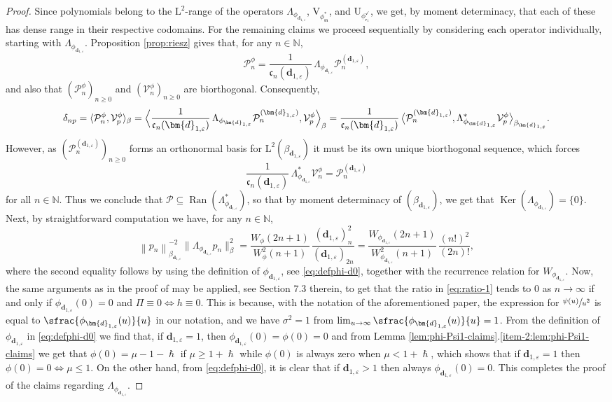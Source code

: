 \documentclass[10pt]{amsart}
\let\epsilon\varepsilon
\theoremstyle{plain}
\theoremstyle{definition}
\newcommand{\norm}[1]{\left\lVert#1\right\rVert}
\newcommand{\bnorm}[1]{\bigl\lVert#1\bigr\rVert}
\DeclareMathOperator{\Ran}{Ran}
\DeclareMathOperator{\Ker}{Ker}
\newcommand{\N}{\mathbb{N}}
\newcommand{\Poly}{\mathscr{P}}
\renewcommand{\P}{\mathcal{P}}
\newcommand{\V}{\mathcal{V}}
\newcommand{\Leb}{\mathrm{L}}
\newcommand{\m}{\mathfrak{m}}
\newcommand{\dz}{{\bm{d}}_{1,\epsilon}}
\newcommand{\lam}{{\bm{\lambda}_1}}
\newcommand{\vat}{{\mathsf{r}_1}}
\newcommand{\phm}{{\phi_\m^*}}
\renewcommand{\varphi}{{\phi_{\vat}^{\checkmark}}}
\newcommand{\gab}[1][\lam,\mo]{{\beta_{#1}}}
\let\h\hslash
\let\mo\mu
\let\bpsi\beta
\begin{document}
\begin{proof}
Since polynomials belong to the $\Leb^2$-range of the operators $\Lambda_{\phi_{\dz}}$, $\mathrm{V}_{\phm}$, and $\mathrm{U}_\varphi$, we get, by moment determinacy, that each of these has dense range in their respective codomains. For the remaining claims we proceed sequentially by considering each operator individually, starting with $\Lambda_{\phi_{\dz}}$. Proposition \ref{prop:riesz} gives that, for any $n \in \N$,
\begin{equation*}
\P_n^\phi = \frac{1}{\mathfrak{c}_n(\dz)}\,\Lambda_{\phi_{\dz}} \P_n^{(\dz)},
\end{equation*}
and also that $(\P_n^\phi)_{n \geq 0}$ and $(\V_n^\phi)_{n \geq 0}$ are biorthogonal. Consequently,
\begin{equation*}
\delta_{np} = \langle \P_n^\phi, \V_p^\phi\rangle_\bpsi = \Bigl \langle \frac{1}{\mathfrak{c}_n(\dz)}\,\Lambda_{\phi_{\dz}} \P_n^{(\dz)}, \V_p^\phi \Bigr\rangle_\bpsi = \frac{1}{\mathfrak{c}_n(\dz)}\, \bigl\langle \P_n^{(\dz)}, \Lambda_{\phi_{\dz}}^* \V_p^\phi \bigr\rangle_{\gab[\dz]}.
\end{equation*}
However, as $(\P_n^{(\dz)})_{n \geq 0}$ forms an orthonormal basis for $\Leb^2(\gab[\dz])$ it must be its own unique biorthogonal sequence, which forces
\begin{equation*}
\frac{1}{\mathfrak{c}_n(\dz)}\,\Lambda_{\phi_{\dz}}^* \V_n^\phi = \P_n^{(\dz)}
\end{equation*}
for all $n \in \N$. Thus we conclude that $\Poly \subseteq \Ran(\Lambda_{\phi_{\dz}}^*)$, so that by moment determinacy of $(\gab[\dz])$, we get that $\Ker(\Lambda_{\phi_{\dz}}) = \{0\}$. Next, by straightforward computation we have, for any $n \in \N$,
\begin{equation}
\label{eq:ratio-1}
\norm{p_n}_{\gab[\dz]}^{-2}\bnorm{\Lambda_{\phi_{\dz}} p_n}_\bpsi^2 = \frac{W_\phi(2n+1)}{W_\phi^2(n+1)}\,\frac{(\dz)_n^2}{(\dz)_{2n}} = \frac{W_{\phi_{\dz}}(2n+1)}{W_{\phi_{\dz}}^2(n+1)}\,\frac{(n!)^2}{(2n)!},
\end{equation}
where the second equality follows by using the definition of $\phi_{\dz}$, see \eqref{eq:defphi-d0}, together with the recurrence relation for $W_{\phi_{\dz}}$. Now, the same arguments as in the proof of \cite[Th.\,7.1(2)]{Patie-Savov-GeL} may be applied, see \eg Section 7.3 therein, to get that the ratio in \eqref{eq:ratio-1} tends to 0 as $n \to \infty$ if and only if $\phi_{\dz}(0) = 0$ and $\Pi \equiv 0 \Leftrightarrow h \equiv 0$. This is because, with the notation of the aforementioned paper, the expression for $\sfrac{\psi(u)}{u^2}$ is equal to $\sfrac{\phi_{\dz}(u)}{u}$ in our notation, and we have $\sigma^2 = 1$ from $\lim_{u \to \infty} \sfrac{\phi_{\dz}(u)}{u} = 1$. From the definition of $\phi_{\dz}$ in \eqref{eq:defphi-d0} we find that, if $\dz = 1$, then $\phi_{\dz}(0) = \phi(0) = 0$ and from Lemma \ref{lem:phi-Psi1-claims}.\eqref{item-2:lem:phi-Psi1-claims} we get that $\phi(0) = \mo-1-\h$ if $\mo \geq 1+\h$ while $\phi(0)$ is always zero when $\mo < 1+\h$, which shows that if $\dz =1$ then $\phi(0)=0 \Leftrightarrow \mo \leq 1$. On the other hand, from \eqref{eq:defphi-d0}, it is clear that if $\dz > 1$ then always $\phi_{\dz}(0)=0$. This completes the proof of the claims regarding $\Lambda_{\phi_{\dz}}$.

\end{proof}
\end{document}
